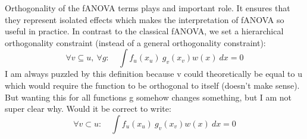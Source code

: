 Orthogonality of the fANOVA terms plays and important role. It ensures that they represent isolated effects which makes the interpretation of fANOVA so useful in practice.
In contrast to the classical fANOVA, we set a hierarchical orthogonality constraint (instead of a general orthogonality constraint):
\begin{equation}
\forall v \subseteq u,\ \forall g:\quad 
\int f_u(x_u)\ g_v(x_v) w(x)\ dx = 0
\label{eq:orthogonality_generalized}
\end{equation}
{\color{blue} I am always puzzled by this definition because v could theoretically be equal to u which would require the function to be orthogonal to itself (doesn't make sense). But wanting this for all functions g somehow changes something, but I am not super clear why. Would it be correct to write:}
\begin{equation}
\forall v \subset u :\quad 
\int f_u(x_u)\ g_v(x_v) w(x)\ dx = 0
\label{eq:orthogonality_generalized}
\end{equation}


